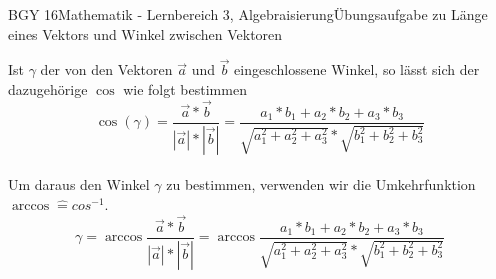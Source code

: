 \documentclass[oneside,openany,headings=optiontotoc,11pt,numbers=noenddot]{scrreprt}
\begin{document}
\begin{worksheet}{BGY 16}{Mathematik - Lernbereich 3, Algebraisierung}{Übungsaufgabe zu Länge eines Vektors und Winkel zwischen Vektoren}
\begin{framed}
			\raggedright
			Ist \(\gamma\) der von den Vektoren \(\vec{a}\) und \(\vec{b}\) eingeschlossene Winkel, so lässt sich der dazugehörige \(\cos\) wie folgt bestimmen
			\[\cos(\gamma) = \frac{\vec{a}*\vec{b}}{|\vec{a}|*|\vec{b}|} = \frac{a_1*b_1 + a_2*b_2 + a_3*b_3}{\sqrt{a_1^2 + a_2^2 + a_3^2}*\sqrt{b_1^2 + b_2^2 + b_3^2}}\]\\
			Um daraus den Winkel \(\gamma\) zu bestimmen, verwenden wir die Umkehrfunktion \(\arccos \widehat{=}cos^{-1}\).
			\[\gamma = \arccos{\frac{\vec{a}*\vec{b}}{|\vec{a}|*|\vec{b}|}} = \arccos{\frac{a_1*b_1 + a_2*b_2 + a_3*b_3}{\sqrt{a_1^2 + a_2^2 + a_3^2}*\sqrt{b_1^2 + b_2^2 + b_3^2}}}\]
		\end{framed}
	\end{worksheet}
\end{document}
